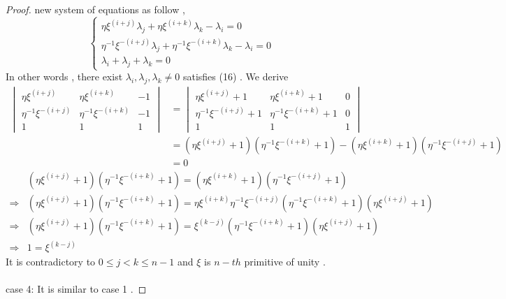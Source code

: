 \documentclass{article}
\begin{document}
\begin{proof}
new system of equations as follow ,
\begin{equation}
\begin{cases}
    \eta\xi^{\scriptscriptstyle (i+j)}\lambda_j+\eta\xi^{\scriptscriptstyle (i+k)}\lambda_k-\lambda_i=0\\
    \eta^{\scriptscriptstyle-1}\xi^{\scriptscriptstyle -(i+j)}\lambda_j+\eta^{\scriptscriptstyle-1}\xi^{\scriptscriptstyle -(i+k)}\lambda_k-\lambda_i=0\\
    \lambda_i+\lambda_j+\lambda_k=0
\end{cases}
\end{equation}
In other words , there exist $\lambda_i,\lambda_j,\lambda_k\neq0$ satisfies (16) . We derive
\begin{align*}
    \begin{vmatrix}
        \eta\xi^{\scriptscriptstyle (i+j)}&\eta\xi^{\scriptscriptstyle (i+k)}&-1\\
        \eta^{\scriptscriptstyle-1}\xi^{\scriptscriptstyle -(i+j)}&\eta^{\scriptscriptstyle-1}\xi^{\scriptscriptstyle -(i+k)}&-1\\
        1&1&1
    \end{vmatrix}&=
    \begin{vmatrix}
        \eta\xi^{\scriptscriptstyle (i+j)}+1&\eta\xi^{\scriptscriptstyle (i+k)}+1&0\\
        \eta^{\scriptscriptstyle-1}\xi^{\scriptscriptstyle -(i+j)}+1&\eta^{\scriptscriptstyle-1}\xi^{\scriptscriptstyle -(i+k)}+1&0\\
        1&1&1
    \end{vmatrix}\\
    &=(\eta\xi^{\scriptscriptstyle (i+j)}+1)(\eta^{\scriptscriptstyle-1}\xi^{\scriptscriptstyle -(i+k)}+1)-
    (\eta\xi^{\scriptscriptstyle (i+k)}+1)(\eta^{\scriptscriptstyle-1}\xi^{\scriptscriptstyle -(i+j)}+1)\\
    &=0
\end{align*}
\begin{align*}
&(\eta\xi^{\scriptscriptstyle (i+j)}+1)(\eta^{\scriptscriptstyle-1}\xi^{\scriptscriptstyle -(i+k)}+1)=(\eta\xi^{\scriptscriptstyle (i+k)}+1)(\eta^{\scriptscriptstyle-1}\xi^{\scriptscriptstyle -(i+j)}+1)\\
\Rightarrow&(\eta\xi^{\scriptscriptstyle (i+j)}+1)(\eta^{\scriptscriptstyle-1}\xi^{\scriptscriptstyle -(i+k)}+1)=\eta\xi^{\scriptscriptstyle (i+k)}\eta^{\scriptscriptstyle-1}\xi^{\scriptscriptstyle -(i+j)}(\eta^{\scriptscriptstyle-1}\xi^{\scriptscriptstyle -(i+k)}+1)(\eta\xi^{\scriptscriptstyle (i+j)}+1)\\
\Rightarrow&(\eta\xi^{\scriptscriptstyle (i+j)}+1)(\eta^{\scriptscriptstyle-1}\xi^{\scriptscriptstyle -(i+k)}+1)=\xi^{\scriptscriptstyle(k-j)}(\eta^{\scriptscriptstyle-1}\xi^{\scriptscriptstyle -(i+k)}+1)(\eta\xi^{\scriptscriptstyle (i+j)}+1)\\
\Rightarrow&1=\xi^{\scriptscriptstyle(k-j)}
\end{align*}
It is contradictory to $0\leq j<k\leq n-1$ and $\xi$ is $n-th$ primitive of unity .\\
\quad\\
case 4: It is similar to case 1 .
\end{proof}
\end{document}
